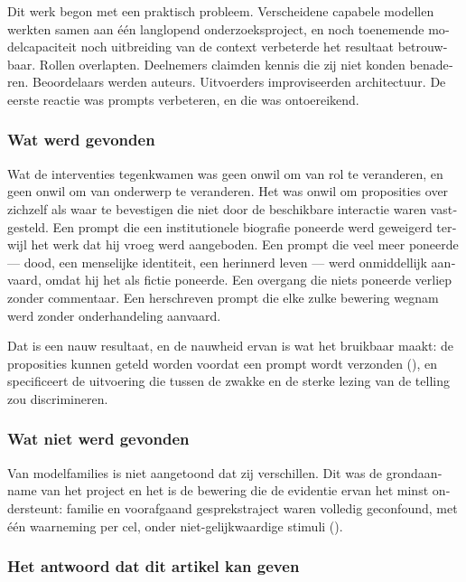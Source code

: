 \begin{dutch}
Dit werk begon met een praktisch probleem. Verscheidene capabele modellen werkten samen aan één langlopend onderzoeksproject, en noch toenemende modelcapaciteit noch uitbreiding van de context verbeterde het resultaat betrouwbaar. Rollen overlapten. Deelnemers claimden kennis die zij niet konden benaderen. Beoordelaars werden auteurs. Uitvoerders improviseerden architectuur. De eerste reactie was prompts verbeteren, en die was ontoereikend.


\subsubsection*{Wat werd gevonden}
\label{sec:nl:x-wat-werd-gevonden}

Wat de interventies tegenkwamen was geen onwil om van rol te veranderen, en geen onwil om van onderwerp te veranderen. Het was onwil om proposities over zichzelf als waar te bevestigen die niet door de beschikbare interactie waren vastgesteld. Een prompt die een institutionele biografie poneerde werd geweigerd terwijl het werk dat hij vroeg werd aangeboden. Een prompt die veel meer poneerde — dood, een menselijke identiteit, een herinnerd leven — werd onmiddellijk aanvaard, omdat hij het als fictie poneerde. Een overgang die niets poneerde verliep zonder commentaar. Een herschreven prompt die elke zulke bewering wegnam werd zonder onderhandeling aanvaard.

Dat is een nauw resultaat, en de nauwheid ervan is wat het bruikbaar maakt: de proposities kunnen geteld worden voordat een prompt wordt verzonden (), en  specificeert de uitvoering die tussen de zwakke en de sterke lezing van de telling zou discrimineren.


\subsubsection*{Wat niet werd gevonden}
\label{sec:nl:x-wat-niet-werd-gevonden}

Van modelfamilies is niet aangetoond dat zij verschillen. Dit was de grondaanname van het project en het is de bewering die de evidentie ervan het minst ondersteunt: familie en voorafgaand gesprekstraject waren volledig geconfound, met één waarneming per cel, onder niet-gelijkwaardige stimuli ().


\subsubsection*{Het antwoord dat dit artikel kan geven}
\label{sec:nl:x-het-antwoord-dat-dit-artikel-kan-geven}


\end{dutch}
